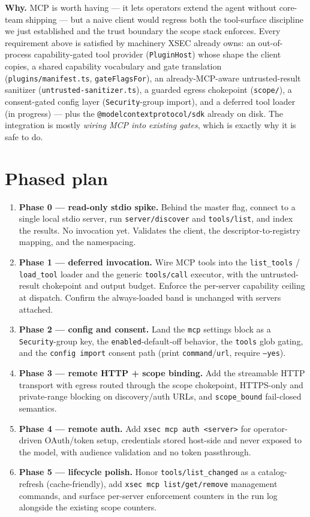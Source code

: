 \documentclass[11pt]{article}
\begin{document}
\textbf{Why.} MCP is worth having --- it lets operators extend the agent without
core-team shipping --- but a naive client would regress both the tool-surface
discipline we just established \cite{tool-curation} and the trust boundary the
scope stack enforces. Every requirement above is satisfied by machinery XSEC
already owns: an out-of-process capability-gated tool provider
(\texttt{PluginHost}) whose shape the client copies, a shared capability
vocabulary and gate translation (\texttt{plugins/manifest.ts},
\texttt{gateFlagsFor}), an already-MCP-aware untrusted-result sanitizer
(\texttt{untrusted-sanitizer.ts}), a guarded egress chokepoint (\texttt{scope/}),
a consent-gated config layer (\texttt{Security}-group import), and a deferred tool
loader (in progress) --- plus the \texttt{@modelcontextprotocol/sdk} already on
disk. The integration is mostly \emph{wiring MCP into existing gates}, which is
exactly why it is safe to do.

\section{Phased plan}

\begin{enumerate}[leftmargin=*]
  \item \textbf{Phase 0 --- read-only stdio spike.} Behind the master flag,
  connect to a single local stdio server, run \texttt{server/discover} and
  \texttt{tools/list}, and index the results. No invocation yet. Validates the
  client, the descriptor-to-registry mapping, and the namespacing.
  \item \textbf{Phase 1 --- deferred invocation.} Wire MCP tools into the
  \texttt{list\_tools} / \texttt{load\_tool} loader and the generic
  \texttt{tools/call} executor, with the untrusted-result chokepoint and output
  budget. Enforce the per-server capability ceiling at dispatch. Confirm the
  always-loaded band is unchanged with servers attached.
  \item \textbf{Phase 2 --- config and consent.} Land the \texttt{mcp}
  settings block as a \texttt{Security}-group key, the \texttt{enabled}-default-off
  behavior, the \texttt{tools} glob gating, and the \texttt{config import}
  consent path (print \texttt{command}/\texttt{url}, require \texttt{--yes}).
  \item \textbf{Phase 3 --- remote HTTP + scope binding.} Add the streamable
  HTTP transport with egress routed through the scope chokepoint, HTTPS-only and
  private-range blocking on discovery/auth URLs, and \texttt{scope\_bound}
  fail-closed semantics.
  \item \textbf{Phase 4 --- remote auth.} Add \texttt{xsec mcp auth <server>} for
  operator-driven OAuth/token setup, credentials stored host-side and never
  exposed to the model, with audience validation and no token passthrough.
  \item \textbf{Phase 5 --- lifecycle polish.} Honor \texttt{tools/list\_changed}
  as a catalog-refresh (cache-friendly), add \texttt{xsec mcp list/get/remove}
  management commands, and surface per-server enforcement counters in the run
  log alongside the existing scope counters.
\end{enumerate}
\end{document}
